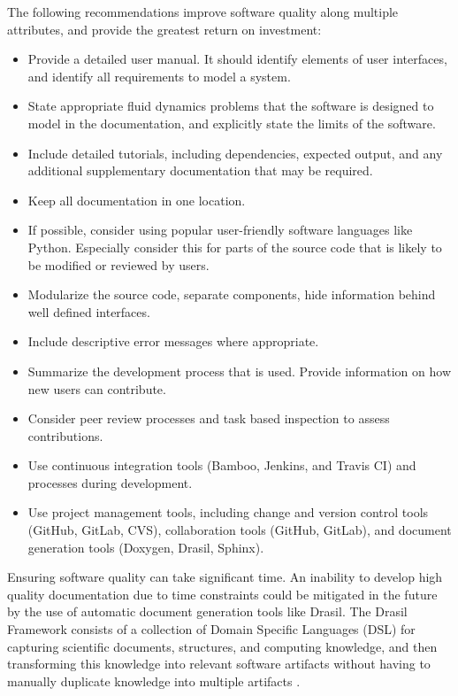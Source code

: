\documentclass[12pt, notitlepage]{article}
\begin{document}
The following recommendations improve software quality along multiple attributes, and provide the greatest return on investment:

\begin{itemize}
	\item Provide a detailed user manual. It should identify elements of user interfaces, and identify all requirements to model a system.
	\item State appropriate fluid dynamics problems that the software is designed to model in the documentation, and explicitly state the limits of the software. 
	\item Include detailed tutorials, including dependencies, expected
	output, and any additional supplementary documentation that may be required.
	\item Keep all documentation in one location.
	\item If possible, consider using popular user-friendly software languages like Python. Especially consider this for parts of the source code that is likely to be modified or reviewed by users. 
	\item Modularize the source code, separate components, hide information behind well defined interfaces.
	\item Include descriptive error messages where appropriate.
	\item Summarize the development process that is used. Provide information on how new users can contribute. 
	\item Consider peer review processes and task based inspection to assess contributions.	
	\item Use continuous integration tools (Bamboo, Jenkins, and Travis CI) and processes during development. 
	\item Use project management tools, including change and version control tools (GitHub, GitLab, CVS), collaboration tools (GitHub, GitLab), and document generation tools (Doxygen, Drasil, Sphinx).
\end{itemize}

Ensuring software quality can take significant time. An inability to develop high quality documentation due to time constraints could be mitigated in the future by the use of automatic document generation tools like Drasil. The Drasil Framework consists of a collection of Domain Specific Languages (DSL) for capturing scientific documents, structures, and computing knowledge, and then transforming this knowledge into relevant software artifacts without having to manually duplicate knowledge into multiple artifacts \citep{zhao2018}.
\end{document}
